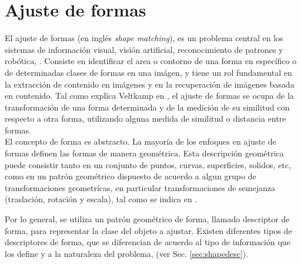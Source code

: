 \section{Ajuste de formas}
\label{sec:shapefitting}

El ajuste de formas (en ingl\'es \emph{shape matching}), es un problema
central en los sistemas de informaci\'on visual, visi\'on artificial, 
reconocimiento de patrones y rob\'otica, \cite{matchingbook}. Consiste
en identificar el area o contorno de una forma en espec\'ifico o de determinadas 
clases de formas en una im\'agen, y tiene un rol fundamental en la extracci\'on
de contenido en im\'agenes y en la recuperaci\'on de im\'agenes basada en contenido.
Tal como explica Veltkamp en \cite{matching2}, el ajuste de formas 
se ocupa de la transformaci\'on de una forma determinada y de la
medici\'on de su similitud con respecto a otra forma, utilizando
alguna medida de similitud o distancia entre formas.\\

El concepto de forma es abstracto. La mayor\'ia de los
enfoques en ajuste de formas definen las formas de manera 
geom\'etrica. Esta descripci\'on geom\'etrica puede 
consistir tanto en un conjunto de puntos, curvas, superficies,
solidos, etc, como en un patr\'on geom\'etrico dispuesto de acuerdo
a algun grupo de transformaciones geometr\'icas, en particular transformaciones
de semejanza (traslaci\'on, rotaci\'on y escala), tal como se indica en
\cite{matching2}. 

Por lo general, se utiliza un patr\'on geom\'etrico de forma, llamado
descriptor de forma, para representar la clase del objeto a ajustar.
Existen diferentes tipos de descriptores de forma, que se diferencian de acuerdo
al tipo de informaci\'on que los define y a la naturaleza del problema, (ver
Sec. \ref{sec:shapedesc}).\\

